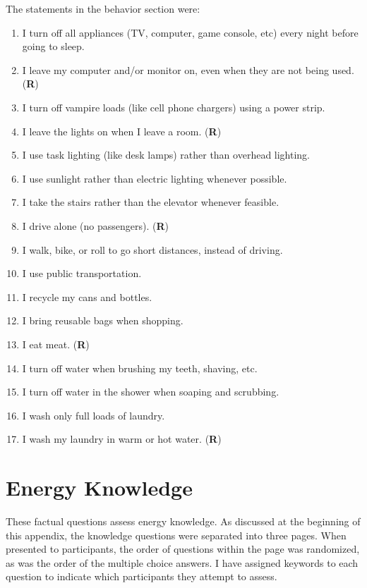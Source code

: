 The statements in the behavior section were:

\begin{enumerate}
	\item I turn off all appliances (TV, computer, game console, etc) every night before going to sleep.
	\item I leave my computer and/or monitor on, even when they are not being used. (\textbf{R})
	\item I turn off vampire loads (like cell phone chargers) using a power strip.
	\item I leave the lights on when I leave a room. (\textbf{R})
	\item I use task lighting (like desk lamps) rather than overhead lighting.
	\item I use sunlight rather than electric lighting whenever possible.
	\item I take the stairs rather than the elevator whenever feasible.
	\item I drive alone (no passengers). (\textbf{R})
	\item I walk, bike, or roll to go short distances, instead of driving.
	\item I use public transportation.
	\item I recycle my cans and bottles.
	\item I bring reusable bags when shopping.
	\item I eat meat. (\textbf{R})
	\item I turn off water when brushing my teeth, shaving, etc.
	\item I turn off water in the shower when soaping and scrubbing.
	\item I wash only full loads of laundry.
	\item I wash my laundry in warm or hot water. (\textbf{R})
\end{enumerate}


\section{Energy Knowledge}
\label{sec:knowledge-items}

These factual questions assess energy knowledge. As discussed at the beginning of this appendix, the knowledge questions were separated into three pages. When presented to participants, the order of questions within the page was randomized, as was the order of the multiple choice answers. I have assigned keywords to each question to indicate which participants they attempt to assess.

